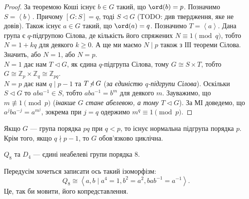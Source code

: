 \documentclass{math_library}
\begin{document}
\begin{proof}
За теоремою Коші існує $b \in G$ такий, що $\ord(b) = p$. Позначимо $S = \left<b\right>$. Причому $[G:S] = q$, тоді $S \triangleleft G$ (TODO: див твердження, яке не довів). Також існує $a \in G$ такий, що $\ord(a) = q$. Позначимо $T = \left<a\right>$. Дана група є $q$-підгрупою Сілова, де кількість його спряжених $N \equiv 1 \pmod q$, тобто $N = 1 + kq$ для деякого $k \geq 0$. А ще ми маємо $N \mid p$ також з ІІІ теореми Сілова. Значить, або $N = 1$, або $N = p$.
\bigskip \\
$N = 1$ дає нам $T \triangleleft G$, як єдина $q$-підгрупа Сілова, тому $G \cong S \times T$, тобто $G \cong \mathbb{Z}_p \times \mathbb{Z}_q \cong \mathbb{Z}_{pq}$.
\bigskip \\
$N = p$ дає нам $q \mid p-1$ та $T \centernot\triangleleft G$ (\textit{за єдиністю $q$-підгрупи Сілова}). Оскільки $S \triangleleft G$ то $aba^{-1} \in S$, тобто $aba^{-1} = b^m$ для деякого $m$. Зауважимо, що $m \not\equiv 1 \pmod p$ (\textit{інакше $G$ стане абелевою, а тому $T \triangleleft G$}). За МІ доведемо, що $a^j b a^{-j} = a^{m^j}$, зокрема при $j = q$ одержимо $m^q \equiv 1 \pmod p$. 
\end{proof}

\begin{corollary}
Якщо $G$ --- група порядка $pq$ при $q < p$, то існує нормальна підгрупа порядка $p$. Крім того, якщо $q \nmid p-1$, то $G$ обов'язково циклічна.
\end{corollary}

\begin{theorem}
$Q_8$ та $D_4$ --- єдині неабелеві групи порядка $8$.
\end{theorem}

\begin{remark}
Передусім хочеться записати ось такий ізоморфізм:
\[
Q_8 \cong \left< a,b \mid a^4 = 1, b^2 = a^2, bab^{-1} = a^{-1}\right>.
\]
Це, так би мовити, його копредставлення.
\end{remark}
\end{document}
